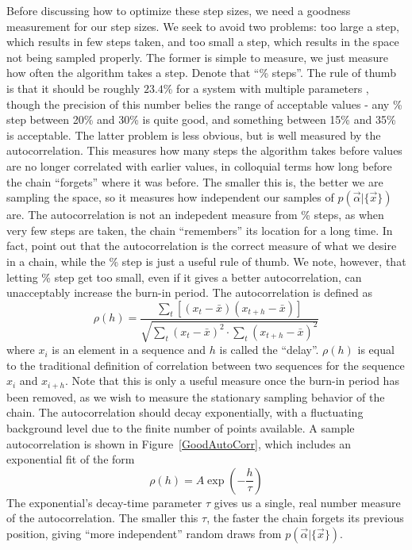 Before discussing how to optimize these step sizes, we need a goodness
measurement for our step sizes.  We seek to avoid two problems: too
large a step, which results in few steps taken, and too small a step,
which results in the space not being sampled properly.  The former is
simple to measure, we just measure how often the algorithm takes a
step.  Denote that ``\% steps''.  The rule of thumb is that it should
be roughly $23.4$\% for a system with multiple parameters
\cite{ref:DataAnalysisBook, DynamicStepPaper}, though the precision of
this number belies the range of acceptable values - any \% step
between 20\% and 30\% is quite good, and something between 15\% and
35\% is acceptable.  The latter problem is less obvious, but is well
measured by the autocorrelation.  This measures how many steps the
algorithm takes before values are no longer correlated with earlier
values, in colloquial terms how long before the chain ``forgets''
where it was before.  The smaller this is, the better we are sampling
the space, so it measures how independent our samples of
$p(\vec{\alpha}|\{\vec{x}\})$ are.  The autocorrelation is not an
indepedent measure from \% steps, as when very few steps are taken,
the chain ``remembers'' its location for a long time.  In fact,
\cite{ref:DataAnalysisBook, NealReport} point out that the
autocorrelation is the correct measure of what we desire in a chain,
while the \% step is just a useful rule of thumb.  We note, however,
that letting \% step get too small, even if it gives a better
autocorrelation, can unacceptably increase the burn-in period.
The autocorrelation is defined as
\begin{equation}
\rho(h) = \frac{\underset{t}{\sum} [(x_t - \bar{x}) (x_{t+h} - \bar{x})]}
  {\sqrt{\underset{t}{\sum} (x_t - \bar{x})^2 \cdot \underset{t}{\sum} 
    (x_{t+h} - \bar{x})^2}}
\end{equation}
where $x_i$ is an element in a sequence and $h$ is called the
``delay''.  $\rho(h)$ is equal to the traditional definition of
correlation between two sequences for the sequence $x_i$ and
$x_{i+h}$.  Note that this is only a useful measure once the burn-in
period has been removed, as we wish to measure the stationary sampling
behavior of the chain.  The autocorrelation should decay
exponentially, with a fluctuating background level due to the finite
number of points available.  A sample autocorrelation is shown in
\mbox{Figure \ref{GoodAutoCorr}}, which includes an exponential fit of
the form
\begin{equation*}
\rho(h) = A \exp(-\frac{h}{\tau})
\end{equation*}
The exponential's decay-time parameter $\tau$ gives us a single, real
number measure of the autocorrelation.  The smaller this $\tau$, the
faster the chain forgets its previous position, giving ``more
independent'' random draws from $p(\vec{\alpha}|\{\vec{x}\})$.

